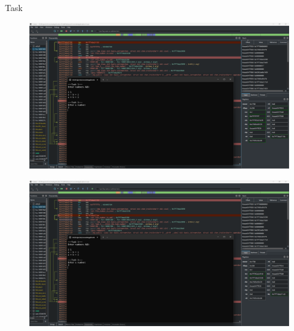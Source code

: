 \documentclass[a4paper,12pt]{article}
\newcommand{\RomanNumeralCaps}[1]{\MakeUppercase{\romannumeral #1}}
\begin{document}
\newpage
    \begin{center}
        \Large{Task \RomanNumeralCaps{2}}
    \end{center}
    \begin{figure}[h!]
        \begin{minipage}[h]{1\linewidth}
            \centering
            \includegraphics[width=1\linewidth]{Prt sc/2_1.png}  
        \end{minipage}
    \end{figure}
    \begin{figure}[h!]
        \begin{minipage}[h]{1\linewidth}
            \centering
            \includegraphics[width=1\linewidth]{Prt sc/2_2.png}  
        \end{minipage}
    \end{figure}
\end{document}
